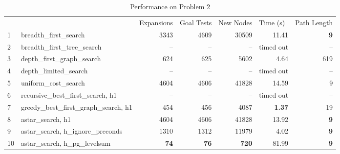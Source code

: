 \documentclass{article}
\theoremstyle{plain}
\theoremstyle{definition}
\theoremstyle{remark}
\begin{document}
\begin{table}[h]
\caption{Performance on Problem 2}
\label{table-performance2}
\begin{tabular}{ll|rrrrr}
   &                                            & \multicolumn{1}{l}{Expansions} & \multicolumn{1}{l}{Goal Tests} & \multicolumn{1}{l}{New Nodes} & \multicolumn{1}{l}{Time (s)} & \multicolumn{1}{l}{Path Length} \\ \cline{2-7} 
1  & breadth\_first\_search                     & 3343                           & 4609                           & 30509                         & 11.41                              & \textbf{9}                      \\
2  & breadth\_first\_tree\_search               & --                             & --                             & --                            & timed out                          & --                              \\
3  & depth\_first\_graph\_search                & 624                            & 625                            & 5602                          & 4.64                               & 619                             \\
4  & depth\_limited\_search                     & --                             & --                             & --                            & timed out                          & --                              \\
5  & uniform\_cost\_search                      & 4604                           & 4606                           & 41828                         & 14.59                              & 9                               \\
6  & recursive\_best\_first\_search, h1   & --                             & --                             & --                            & timed out                          & --                              \\
7  & greedy\_best\_first\_graph\_search, h1 & 454                            & 456                            & 4087                          & \textbf{1.37}                      & 19                              \\
8  & astar\_search, h1                    & 4604                           & 4606                           & 41828                         & 13.92                              & \textbf{9}                      \\
9  & astar\_search, h\_ignore\_preconds     & 1310                           & 1312                           & 11979                         & 4.02                               & \textbf{9}                      \\
10 & astar\_search, h\_pg\_levelsum         & \textbf{74}                    & \textbf{76}                    & \textbf{720}                  & 81.99                              & \textbf{9}                     
\end{tabular}


\end{table}
\end{document}
